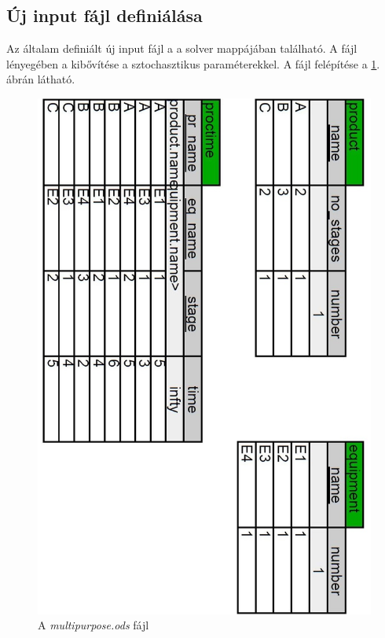 \subsection{Új input fájl definiálása}
Az általam definiált új input fájl a  a solver  mappájában található.
A fájl lényegében a  kibővítése a sztochasztikus paraméterekkel.
A  fájl felépítése a \ref{multipurpose_odshere}. ábrán látható.
\begin{figure}[H]
\begin{center}
\includegraphics[scale=0.375]{multipurposeOds}
\caption{A \textit{multipurpose.ods} fájl}
\label{multipurpose_odshere}
\end{center}
\end{figure}
